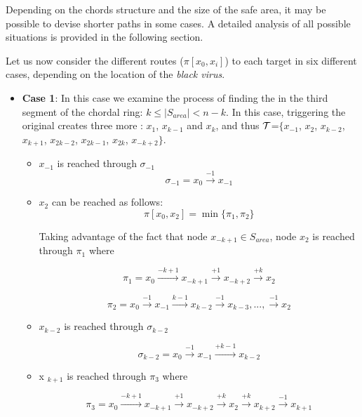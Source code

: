 Depending on the chords structure and the size of the safe area, it may be possible to devise shorter paths in some cases. A detailed analysis of all possible situations is provided in the following  section.
 


Let us now consider the different routes ($\pi[x_0,x_{i}] $) to each target in six different cases, depending on the location of the {\it black virus}.  
\begin{itemize}
\item {\bf Case 1}: In this case we examine the process of finding the \bv in the third segment of the chordal ring: $k\leq |S_{area}| <n-k$. In this case, triggering the original \bv creates three more \bvs: $x_{1}$, $x_{k-1}$ and $x_{k}$, and thus $\cal T$=$\{ x_{-1}$,  $x_{2}$, $x_{k-2}$, $x_{k+1}$, $x_{2k-2}$, $x_{2k-1}$, $x_{2k}$, $x_{-k+2}\}$. 
\begin{itemize}

\item  $x_{-1}$ is reached through  $\sigma_{-1}$ 
$$ \sigma_{-1} =  x_{0}\xrightarrow {-1}x_{-1}$$


\item  $x_{2}$  can be reached as follows:
$$ \pi[x_0,x_{2}] = \min \{   \pi_{1}, \pi_{2}\}$$

Taking advantage of the fact that node $x_{-k+1}\in S_{area}$, node  $x_{2}$ is reached through $\pi_1$ where 
 
$$\pi_1 =  x_{0}\xrightarrow {-k+1}x_{-k+1} \xrightarrow {+1}x_{-k+2}\xrightarrow {+k} x_{2}$$

$$\pi_2 =  x_{0}\xrightarrow {-1}x_{-1} \xrightarrow {k-1}x_{k-2}\xrightarrow {-1}x_{k-3},..., \xrightarrow {-1} x_{2}$$



\item  $x_{k-2}$  is reached through  $\sigma_{k-2}$ 
 
$$ \sigma_{k-2} =  x_{0}\xrightarrow {-1}x_{-1}\xrightarrow {+k-1}x_{k-2}$$




\item x $_ {k+1}$  is reached through $\pi_3$ where 
 
$$\pi_3 =  x_{0}\xrightarrow {-k+1}x_{-k+1} \xrightarrow {+1}x_{-k+2}\xrightarrow {+k} x_{2}\xrightarrow {+k} x_{k+2}\xrightarrow {-1} x_{k+1}$$
 


\end{itemize}
\end{itemize}
